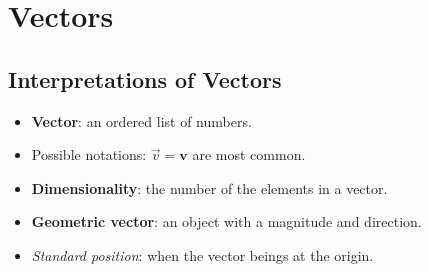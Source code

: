 \documentclass[12pt,a4paper]{article}
\begin{document}
\tableofcontents
\cleardoublepage
\fancyhead{}

\clearpage
\section{Vectors}
\subsection{Interpretations of Vectors}
\begin{itemize}
    \item \textbf{Vector}: an ordered list of numbers. 
    \item Possible notations: \(\vec{v}=\bm{v}\) are most common.
    \item \textbf{Dimensionality}: the number of the elements in a vector.
    \item \textbf{Geometric vector}: an object with a magnitude and direction.
    \item \textit{Standard position}: when the vector beings at the origin.
\end{itemize}
\end{document}
